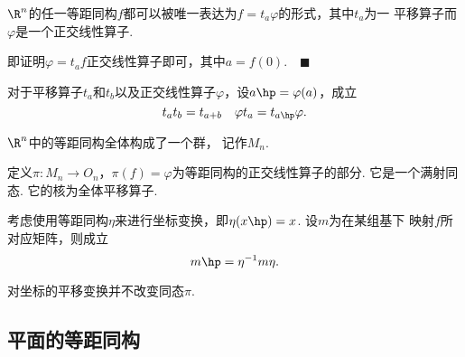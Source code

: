   \begin{cor}
    $\R^n$的任一等距同构$f$都可以被唯一表达为$f=t_a\varphi$的形式，其中$t_a$为一
    平移算子而$\varphi$是一个正交线性算子.
  \end{cor}
  \proof 即证明$\varphi=t_af$正交线性算子即可，其中$a=f(0)$.$\quad\blacksquare$

  \begin{pos}
    对于平移算子$t_a$和$t_b$以及正交线性算子$\varphi$，设$a\hp=\varphi(a)$，成立
    \[
      t_at_b = t_{a+b}\quad \varphi t_a = t_{a\hp}\varphi.
    \]
  \end{pos}

  \begin{thm}
    $\R^n$中的等距同构全体构成了一个群，记作$M_n$.
  \end{thm}

  \begin{thm}
    定义$\pi:M_n\to O_n$，$\pi(f)=\varphi$为等距同构的正交线性算子的部分. 
    它是一个满射同态. 它的核为全体平移算子.
  \end{thm}

  \begin{thm}[坐标变换]
    考虑使用等距同构$\eta$来进行坐标变换，即$\eta(x\hp)=x$. 设$m$为在某组基下
    映射$f$所对应矩阵，则成立
    \[
      m\hp = \eta^{-1}m\eta.
    \]
  \end{thm}

  \begin{cor}
    对坐标的平移变换并不改变同态$\pi$.
  \end{cor}

  \begin{defi}[定向]
  \end{defi}


\subsection{平面的等距同构}





